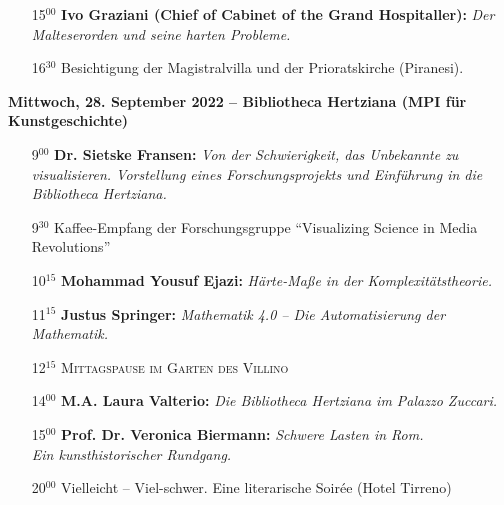 \begin{description}
\begin{itemize}
\item[15$^{00}$] {\textbf{Ivo Graziani (Chief of Cabinet of the Grand Hospitaller):}}
         {\emph{Der Malteserorden und seine harten Probleme.}}
\item[16$^{30}$] {Besichtigung der Magistralvilla und der Prioratskirche (Piranesi).}
\end{itemize}
\smallskip

\newpage

\item {\textbf{ Mittwoch, 28. September 2022 -- Bibliotheca Hertziana (MPI für Kunstgeschichte)}}
\begin{itemize}
\item[9$^{00}$] {\textbf{Dr. Sietske Fransen:}} {\emph{Von der Schwierigkeit, das Unbekannte zu visualisieren. 
	Vorstellung eines Forschungsprojekts und Einführung in die Bibliotheca Hertziana.}}
\item[9$^{30}$] \hfill {Kaffee-Empfang der Forschungsgruppe } ``Visualizing Science in Media Revolutions'' \hfill ~
\item[10$^{15}$] {\textbf{Mohammad Yousuf Ejazi:}} {\emph{Härte-Maße in der Komplexitätstheorie.}}
\item[11$^{15}$] {\textbf{Justus Springer:}} {\emph{Mathematik 4.0 – Die Automatisierung der Mathematik.}}
\item[12$^{15}$] \hfill {\textsc{Mittagspause im Garten des Villino}} \hfill ~
\item[14$^{00}$] {\textbf{M.A. Laura Valterio:}} {\emph{Die Bibliotheca Hertziana im Palazzo Zuccari.}}
\item[15$^{00}$] {\textbf{Prof. Dr. Veronica Biermann:}} {\emph{Schwere Lasten in Rom. \\ Ein kunsthistorischer Rundgang.}}
\item[20$^{00}$] \hfill {Vielleicht -- Viel-schwer. Eine literarische Soir\'ee (Hotel Tirreno)} \hfill ~
\end{itemize}



\end{description}
